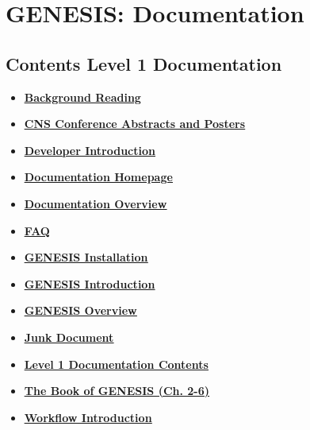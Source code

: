 \documentclass[12pt]{article}
\begin{document}
\section*{GENESIS: Documentation}

\subsection*{Contents Level 1 Documentation}

\begin{itemize}

\item \href{../background-material/background-material.pdf}{\bf \underline{Background Reading}}

\item \href{../cns/cns.pdf}{\bf \underline{CNS Conference Abstracts and Posters}}

\item \href{../developer-intro/developer-intro.pdf}{\bf \underline{Developer Introduction}}

\item \href{../documentation-homepage/documentation-homepage.pdf}{\bf \underline{Documentation Homepage}}

\item \href{../documentation-overview/documentation-overview.pdf}{\bf \underline{Documentation Overview}}

\item \href{../faq/faq.pdf}{\bf \underline{FAQ}}

\item \href{../genesis-installation/genesis-installation.pdf}{\bf \underline{GENESIS Installation}}

\item \href{../genesis-intro/genesis-intro.pdf}{\bf \underline{GENESIS Introduction}}

\item \href{../genesis-overview/genesis-overview.pdf}{\bf \underline{GENESIS Overview}}

\item \href{../junk-document/junk-document.pdf}{\bf \underline{Junk Document}}

\item \href{../contents-level1/contents-level1.pdf}{\bf \underline{Level 1 Documentation Contents}}

\item \href{../book-of-genesis/book-of-genesis.pdf}{\bf \underline{The Book of GENESIS (Ch. 2-6)}}

\item \href{../workflow-intro/workflow-intro.pdf}{\bf \underline{Workflow Introduction}}


\end{itemize}

\end{document}
